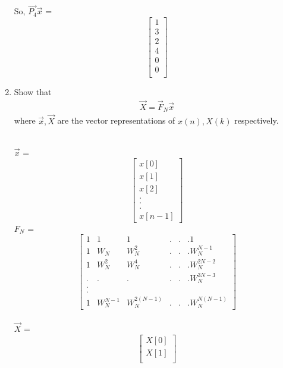 \documentclass[journal,12pt,twocolumn]{IEEEtran}
\renewcommand\thesection{\arabic{section}}
\begin{document}
\begin{enumerate}[label=\arabic*.,ref=\thesection.\theenumi]
\begin{solution}
So, $\vec{P_{4}}\vec{x}$ = 
\begin{equation}
	\begin{bmatrix}
		1 \\
		3 \\
		2 \\
		4 \\
		0 \\
		0 \\
	\end{bmatrix}
\end{equation}
\end{solution}
\item Show that 
    \begin{align}
	    \vec{X} = \vec{F}_N \vec{x}
	    \label{eq:dft-mat-def}
    \end{align}
		where $\vec{x}, \vec{X}$ are the vector representations of $x(n), X(k)$ respectively.\
\\		
\begin{solution}
\\
$\vec{x}$ =
\begin{equation}
	\begin{bmatrix}
		x[0] \\
		x[1] \\
		x[2] \\
		. \\
		. \\
		. \\
		x[n-1]
	\end{bmatrix}
\end{equation}
$F_{N}$ =
\\
\begin{equation}
	\begin{bmatrix}
		1 & 1 & 1 & . & . & . 1 \\
		1 & W_N & W_N^{2} & . & . &. W_N^{N-1}\\
		1 & W_N^{2} & W_N^{4} & . & . &. W_N^{2N-2} \\
		. & . & . & . & . &. W_N^{3N-3}\\
		. \\
		. \\
		1 & W_N^{N-1} & W_N^{2(N-1)} & . & . &. W_N^{N(N-1)}
	\end{bmatrix}
\end{equation}
\\
$\vec{X}$ =
\begin{equation}
	\begin{bmatrix}
		X[0] \\
		X[1] \\

\end{bmatrix}
\end{equation}
\end{solution}
\end{enumerate}
\end{document}
